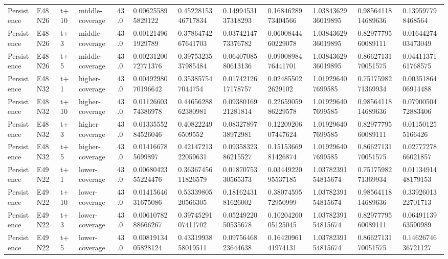 \begin{landscape}
\begin{longtable}{llllllllllll}
Persistence & E48N26 & t+10 & middle-coverage & 43.0 & 0.006255895829122 & 0.4522815346717834 & 0.1499453137318293 & 0.1684628973404566 & 1.0384362936019895 & 0.9856411814689636 & 0.139597798468564 \\
Persistence & E48N26 & t+3 & middle-coverage & 43.0 & 0.001214961929789 & 0.3786474267641703 & 0.0374214773376782 & 0.0600844460229078 & 1.0384362936019895 & 0.8297779560089111 & 0.0164427403473049 \\
Persistence & E48N26 & t+5 & middle-coverage & 43.0 & 0.0023120072771376 & 0.3975323537985484 & 0.0640708580613136 & 0.0900898476441701 & 1.0384362936019895 & 0.8662713170051575 & 0.0441137161768575 \\
Persistence & E48N32 & t+1 & higher-coverage & 43.0 & 0.0049298070196642 & 0.353857547044754 & 0.0174212617178757 & 0.024855022629102 & 1.019296407699585 & 0.7517598271369934 & 0.0035186406914488 \\
Persistence & E48N32 & t+10 & higher-coverage & 43.0 & 0.0112660374386978 & 0.4465628862380981 & 0.0938016921281814 & 0.2265905986229578 & 1.019296407699585 & 0.9856411814689636 & 0.0790050472883406 \\
Persistence & E48N32 & t+3 & higher-coverage & 43.0 & 0.0133555284526046 & 0.408222496509552 & 0.0832789738972981 & 0.1220920607447624 & 1.019296407699585 & 0.8297779560089111 & 0.011501255166426 \\
Persistence & E48N32 & t+5 & higher-coverage & 43.0 & 0.014166785699897 & 0.4214721322059631 & 0.0935832386215527 & 0.1515366981426874 & 1.019296407699585 & 0.8662713170051575 & 0.0277727866021857 \\
Persistence & E49N22 & t+1 & lower-coverage & 43.0 & 0.0068042355224476 & 0.3636745611826579 & 0.0187075330565373 & 0.0344922095537185 & 1.0378239154815674 & 0.7517598271369934 & 0.0113491448179153 \\
Persistence & E49N22 & t+10 & lower-coverage & 43.0 & 0.0141564631675086 & 0.5333980520566305 & 0.1816243181626002 & 0.3807459572950999 & 1.0378239154815674 & 0.9856411814689636 & 0.3392601322701713 \\
Persistence & E49N22 & t+3 & lower-coverage & 43.0 & 0.0061078288666267 & 0.3974529107411702 & 0.0524922050535678 & 0.1020426005125045 & 1.0378239154815674 & 0.8297779560089111 & 0.0649113963590989 \\
Persistence & E49N22 & t+5 & lower-coverage & 43.0 & 0.0081913405828124 & 0.4331993858019511 & 0.0975646823644638 & 0.1642096141974131 & 1.0378239154815674 & 0.8662713170051575 & 0.1462674636721127 \\

\end{longtable}
\end{landscape}

